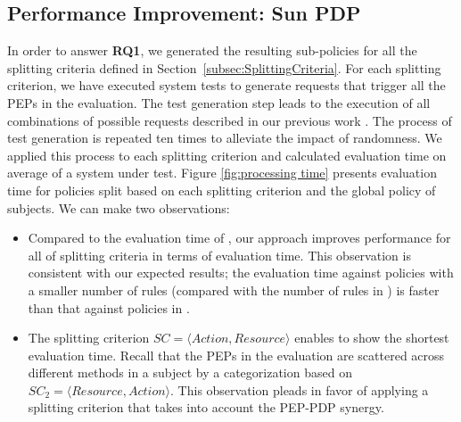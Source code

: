 \subsection{Performance Improvement: Sun PDP}\label{subsec:performanceimprovement}
In order to answer \textbf{RQ1}, we generated the resulting sub-policies for all the splitting criteria defined in 
Section~\ref{subsec:SplittingCriteria}.
For each splitting criterion, we have executed system tests to generate requests that trigger all the PEPs in the evaluation. 
The test generation step leads to the execution of all combinations of possible requests described in our previous work \cite{testcase}.  
The process of test generation is repeated ten times to alleviate the impact of randomness. 
We applied this process to each splitting criterion and calculated evaluation time on average of a system under test.
Figure \ref{fig:processing time} presents evaluation time for policies split
based on each splitting criterion and the global policy of subjects. We can make two observations:
\begin{itemize}
\item Compared to the evaluation time of , our approach improves performance for all of splitting criteria
in terms of evaluation time. This observation is consistent with our expected results; the evaluation time against
policies with a smaller number of rules (compared with the number of rules in ) is faster than that against
policies in .
\item The splitting criterion \normalsize $SC=\langle Action, Resource\rangle$ enables to show the shortest evaluation time. 
Recall that the PEPs in the evaluation are scattered across different methods in a subject by a categorization 
based on $SC_{2}=\langle Resource,Action\rangle$. This observation pleads in favor of applying a splitting criterion 
that takes into account the PEP-PDP synergy.
\end{itemize}
